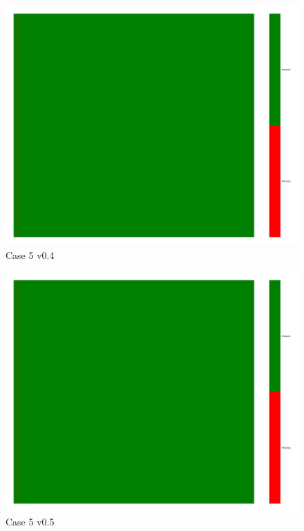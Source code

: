 \documentclass[a4paper,12pt]{article}
\begin{document}
\begin{figure}[H]
    \includegraphics[width=\linewidth]{case5_v0.4_heatmap_cleaned.png}
    \caption*{Case 5 v0.4}
\end{figure}

\begin{figure}[H]
    \includegraphics[width=\linewidth]{case5_v0.5_heatmap_cleaned.png}
    \caption*{Case 5 v0.5}
\end{figure}
\end{document}
